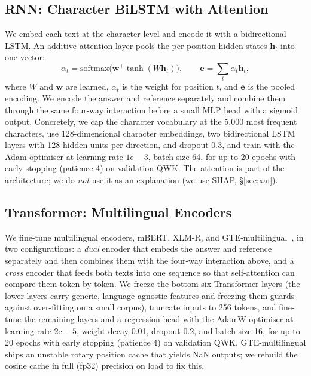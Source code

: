 \subsection{RNN: Character BiLSTM with Attention}
We embed each text at the character level and encode it with a bidirectional LSTM. An additive
attention layer pools the per-position hidden states $\mathbf{h}_t$ into one vector:
\begin{equation}
\alpha_t=\mathrm{softmax}\!\big(\mathbf{w}^\top \tanh(W\mathbf{h}_t)\big),\qquad
\mathbf{e}=\sum_t \alpha_t \mathbf{h}_t,
\end{equation}
where $W$ and $\mathbf{w}$ are learned, $\alpha_t$ is the weight for position $t$, and $\mathbf{e}$ is
the pooled encoding. We encode the answer and reference separately and combine them through the same
four-way interaction before a small MLP head with a sigmoid output. Concretely, we cap the character
vocabulary at the 5{,}000 most frequent characters, use 128-dimensional character embeddings, two
bidirectional LSTM layers with 128 hidden units per direction, and dropout 0.3, and train with the Adam
optimiser at learning rate $1\mathrm{e}{-}3$, batch size 64, for up to 20 epochs with early stopping
(patience 4) on validation QWK. The attention is part of the architecture; we do \emph{not} use it as an
explanation (we use SHAP, \S\ref{sec:xai}).

\subsection{Transformer: Multilingual Encoders}
We fine-tune multilingual encoders, mBERT, XLM-R, and GTE-multilingual~\citep{devlin2019bert}, in two
configurations: a \emph{dual} encoder that embeds the answer and reference separately and then combines
them with the four-way interaction above, and a \emph{cross} encoder that feeds both texts into one
sequence so that self-attention can compare them token by token. We freeze the bottom six Transformer
layers (the lower layers carry generic, language-agnostic features and freezing them guards against
over-fitting on a small corpus), truncate inputs to 256 tokens, and fine-tune the remaining layers and
a regression head with the AdamW optimiser at learning rate $2\mathrm{e}{-}5$, weight decay 0.01,
dropout 0.2, and batch size 16, for up to 20 epochs with early stopping (patience 4) on validation QWK.
GTE-multilingual ships an unstable rotary position cache that yields NaN outputs; we rebuild the cosine
cache in full (fp32) precision on load to fix this.

